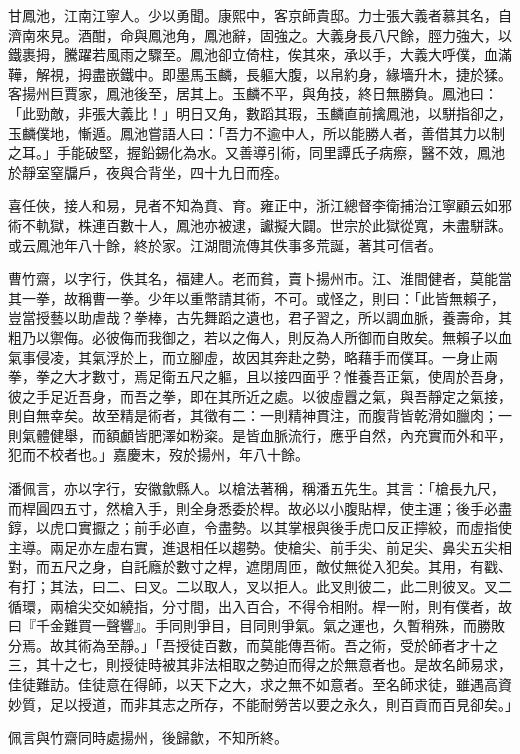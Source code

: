 \begin{pinyinscope}
甘鳳池，江南江寧人。少以勇聞。康熙中，客京師貴邸。力士張大義者慕其名，自濟南來見。酒酣，命與鳳池角，鳳池辭，固強之。大義身長八尺餘，脛力強大，以鐵裹拇，騰躍若風雨之驟至。鳳池卻立倚柱，俟其來，承以手，大義大呼僕，血滿鞾，解視，拇盡嵌鐵中。即墨馬玉麟，長軀大腹，以帛約身，緣墻升木，捷於猱。客揚州巨賈家，鳳池後至，居其上。玉麟不平，與角技，終日無勝負。鳳池曰：「此勁敵，非張大義比！」明日又角，數蹈其瑕，玉麟直前擒鳳池，以駢指卻之，玉麟僕地，慚遁。鳳池嘗語人曰：「吾力不逾中人，所以能勝人者，善借其力以制之耳。」手能破堅，握鉛錫化為水。又善導引術，同里譚氏子病瘵，醫不效，鳳池於靜室窒牖戶，夜與合背坐，四十九日而痊。

喜任俠，接人和易，見者不知為賁、育。雍正中，浙江總督李衛捕治江寧顧云如邪術不軌獄，株連百數十人，鳳池亦被逮，讞擬大闢。世宗於此獄從寬，未盡駢誅。或云鳳池年八十餘，終於家。江湖間流傳其佚事多荒誕，著其可信者。

曹竹齋，以字行，佚其名，福建人。老而貧，賣卜揚州市。江、淮間健者，莫能當其一拳，故稱曹一拳。少年以重幣請其術，不可。或怪之，則曰：「此皆無賴子，豈當授藝以助虐哉？拳棒，古先舞蹈之遺也，君子習之，所以調血脈，養壽命，其粗乃以禦侮。必彼侮而我御之，若以之侮人，則反為人所御而自敗矣。無賴子以血氣事侵凌，其氣浮於上，而立腳虛，故因其奔赴之勢，略藉手而僕耳。一身止兩拳，拳之大才數寸，焉足衛五尺之軀，且以接四面乎？惟養吾正氣，使周於吾身，彼之手足近吾身，而吾之拳，即在其所近之處。以彼虛囂之氣，與吾靜定之氣接，則自無幸矣。故至精是術者，其徵有二：一則精神貫注，而腹背皆乾滑如臘肉；一則氣體健舉，而額顱皆肥澤如粉粢。是皆血脈流行，應乎自然，內充實而外和平，犯而不校者也。」嘉慶末，歿於揚州，年八十餘。

潘佩言，亦以字行，安徽歙縣人。以槍法著稱，稱潘五先生。其言：「槍長九尺，而桿圓四五寸，然槍入手，則全身悉委於桿。故必以小腹貼桿，使主運；後手必盡錞，以虎口實擫之；前手必直，令盡勢。以其掌根與後手虎口反正擰絞，而虛指使主導。兩足亦左虛右實，進退相任以趨勢。使槍尖、前手尖、前足尖、鼻尖五尖相對，而五尺之身，自託廕於數寸之桿，遮閉周匝，敵仗無從入犯矣。其用，有戳、有打；其法，曰二、曰叉。二以取人，叉以拒人。此叉則彼二，此二則彼叉。叉二循環，兩槍尖交如繞指，分寸間，出入百合，不得令相附。桿一附，則有僕者，故曰『千金難買一聲響』。手同則爭目，目同則爭氣。氣之運也，久暫稍殊，而勝敗分焉。故其術為至靜。」「吾授徒百數，而莫能傳吾術。吾之術，受於師者才十之三，其十之七，則授徒時被其非法相取之勢迫而得之於無意者也。是故名師易求，佳徒難訪。佳徒意在得師，以天下之大，求之無不如意者。至名師求徒，雖遇高資妙質，足以授道，而非其志之所存，不能耐勞苦以要之永久，則百貢而百見卻矣。」

佩言與竹齋同時處揚州，後歸歙，不知所終。


\end{pinyinscope}
